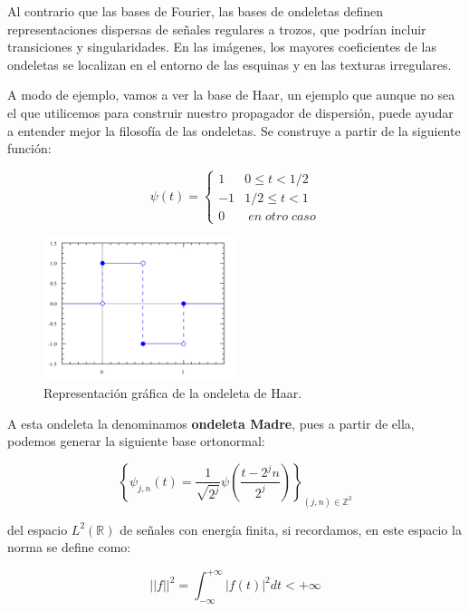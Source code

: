 \medskip

\noindent Al contrario que las bases de Fourier, las bases de ondeletas definen  representaciones dispersas de señales regulares a trozos, que podrían incluir transiciones y singularidades. En las imágenes, los mayores coeficientes de las ondeletas se localizan en el entorno de las esquinas y en las texturas irregulares.

\medskip

\noindent A modo de ejemplo, vamos a ver la base de Haar, un ejemplo que aunque no sea el que utilicemos para construir nuestro propagador de dispersión, puede ayudar a entender mejor la filosofía de las ondeletas. Se construye a partir de la siguiente función: 

$$ \psi(t)= \begin{cases} 
      1 & 0\leq t < 1/2 \\
      -1 & 1/2\leq t < 1 \\
      0 & \; en \; otro \; caso
   \end{cases}$$

\begin{figure}[!h]
  \centering
  \includegraphics[width=0.5\textwidth]{img/Haar_wavelet.png}
  \caption{Representación gráfica de la ondeleta de Haar.}
  \label{fig:Ondeleta_de_Haar}
\end{figure}

\noindent A esta ondeleta la denominamos \textbf{ondeleta Madre}, pues a partir de ella, podemos generar la siguiente base ortonormal:

\medskip

$$\left \lbrace \psi_{j,n}(t)= \frac{1}{\sqrt{2^j}} \psi\left(\frac{t-2^jn}{2^j}\right) \right\rbrace_{(j,n) \in \mathbb{Z}^2}$$

\noindent del espacio $L^2(\mathbb{R})$ de señales con energía finita, si recordamos, en este espacio la norma se define como: 

\begin{definicion}
  $$||f||^2=\int_{-\infty}^{+\infty} |f(t)|^2 dt < +\infty$$
\end{definicion}

